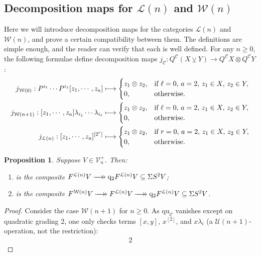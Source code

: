\documentclass[11pt]{amsart} \renewcommand{\baselinestretch}{1.2}
\theoremstyle{plain}
\newtheorem{prop}[thm]{Proposition}
\numberwithin{equation}{section} %
\theoremstyle{plain}
\newtheorem{prop}[thm]{Proposition}
\numberwithin{equation}{chapter} %
\renewcommand{\to}{\longrightarrow}
\newcommand{\scrL}{\mathscr{L}}
\newcommand{\calU}{\mathcal{U}}
\newcommand{\calL}{\mathcal{L}}
\newcommand{\calV}{\mathcal{V}}
\newcommand{\calw}{\mathcal{W}}
\newcommand{\calc}{\mathcal{C}}
\newcommand{\restn}[1]{#1^{[2]}}
\newcommand{\restnRepeated}[2]{#1^{[2^{#2}]}}
\newcommand{\vect}[2]{\calV^{#1}_{#2}}
\newcommand{\quadratic}{\mathrm{qu}}
\newcommand{\quadgrad}[1]{\mathrm{q}_{#1}}
\newcommand{\epi}{{\,\makebox[0cm][l]{\ensuremath\to}\to{}}}
\newcommand{\restliealgs}{{\scrL\!\textit{ie}^\textit{r}}}
\newcommand{\smashcoprod}{\veebar}%
\newcommand{\SubsectionOrSection}[1]{\subsection{#1}}
\begin{document}
\begin{homotopy operations for PRLs}
\SubsectionOrSection{Decomposition maps for $\calL(n)$ and $\calw(n)$}
Here we will introduce decomposition maps for the categories $\calL(n)$ and $\calw(n)$, and prove a certain compatibility between them. The definitions are simple enough, and the reader can verify that each is well defined. For any  $n\geq0$, the following formulae define decomposition maps $j_\calc:Q^\calc(X\smashcoprod Y)\to Q^\calc X\otimes Q^\calc Y$:
\begin{alignat*}{2}
j_{\calw(0)}:P^{i_\ell}\cdots P^{i_1}[z_1,\cdots ,z_a]&\longmapsto\begin{cases}
z_1\otimes z_2,&\textup{if }\ell=0,\,a=2,\,z_1\in X,\,z_2\in Y,
\\0,&\textup{otherwise.}
\end{cases}
\\
j_{\calw(n+1)}:[z_1,\cdots ,z_a]\lambda_{i_1}\cdots \lambda_{i_\ell}&\longmapsto\begin{cases}
z_1\otimes z_2,&\textup{if }\ell=0,\,a=2,\,z_1\in X,\,z_2\in Y,
\\0,&\textup{otherwise.}
\end{cases}
\\
j_{\calL(n)}:\restnRepeated{[z_1,\cdots ,z_a]}{r}&\longmapsto\begin{cases}
z_1\otimes z_2,&\textup{if }r=0,\,a=2,\,z_1\in X,\,z_2\in Y,
\\0,&\textup{otherwise.}
\end{cases}
\end{alignat*}
\begin{prop}
\label{quadpartcalc for various W and L}
Suppose $V\in\vect{+}{n}$. Then:
\begin{enumerate}
\item \makebox[\widthof{$\quadratic_\restliealgs$}][l]{$\quadratic_{\calL(n)}$} is the composite $F^{\calL(n)} V\epi \quadgrad{2}F^{\calL(n)} V\subseteq \Sigma S^2V$;
\item \makebox[\widthof{$\quadratic_\restliealgs$}][l]{$\quadratic_{\calw(n)}$} is the composite $F^{\calw(n)} V\epi F^{\calL(n)} V\epi \quadgrad{2}F^{\calL(n)} V\subseteq \Sigma S^2V$.\end{enumerate}
\end{prop}
\begin{proof}
Consider the case $\calw(n+1)$ for $n\geq0$. As $\quadratic_\calc$ vanishes except on quadratic grading 2, one only checks terms $[x,y]$, $\restn{x}$, and $x\lambda_i$ (a $\calU(n+1)$-operation, not the restriction):
\begin{alignat*}{2}

\end{alignat*}
\end{proof}
\end{homotopy operations for PRLs}
\end{document}
